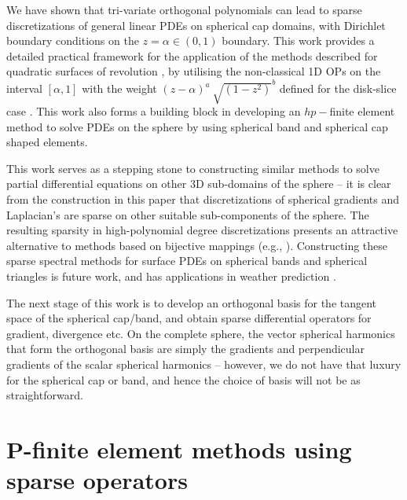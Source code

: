 \documentclass[11pt, oneside]{article}   	%
\begin{document}
We have shown that tri-variate orthogonal polynomials can lead to sparse discretizations of general linear PDEs on spherical cap domains, with Dirichlet boundary conditions on the $z = \alpha \in (0,1)$ boundary. This work provides a detailed practical framework for the application of the methods described for quadratic surfaces of revolution \cite{olver2020orthogonal}, by utilising the non-classical 1D OPs on the interval $[\alpha, 1]$ with the weight $(z - \alpha)^a \: \sqrt{(1-z^2)}^b$ defined for the disk-slice case \cite{snowball2019sparse}. This work also forms a building block in developing an $hp-$finite element method to solve PDEs on the sphere by using spherical band and spherical cap shaped elements.

This work serves as a stepping stone to constructing similar methods to solve partial differential equations on other 3D sub-domains of the sphere -- it is clear from the construction in this paper that discretizations of spherical gradients and Laplacian's are sparse on other suitable sub-components of the sphere. The resulting sparsity in high-polynomial degree discretizations presents an attractive alternative to methods based on bijective mappings (e.g., \cite{DGShallowWater,FEMShallowWater,boyd2005sphere}). Constructing these sparse spectral methods for surface PDEs on spherical bands and spherical triangles is future work, and has applications in weather prediction \cite{staniforth2012horizontal}.

The next stage of this work is to develop an orthogonal basis for the tangent space of the spherical cap/band, and obtain sparse differential operators for gradient, divergence etc. On the complete sphere, the vector spherical harmonics that form the orthogonal basis are simply the gradients and perpendicular gradients of the scalar spherical harmonics \cite{barrera1985vector} -- however, we do not have that luxury for the spherical cap or band, and hence the choice of basis will not be as straightforward.




%
\appendix
%
\section{P-finite element methods using sparse operators}\label{Appendix:PFEM}
\end{document}
